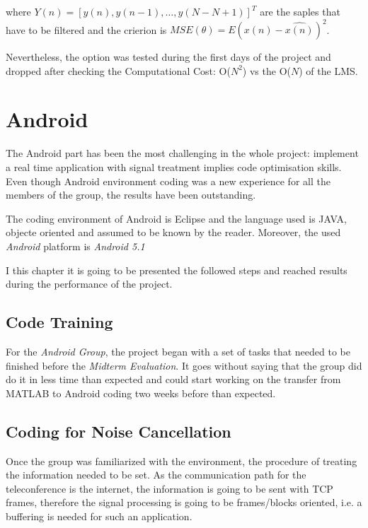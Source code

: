 \documentclass[11pt,a4paper,english]{book}  %
\theoremstyle{definition}  %
\theoremstyle{plain}  %
\theoremstyle{remark}  %
\begin{document}
	where $Y(n)= [y(n),y(n-1),\dots,y(N-N+1)]^T$ are the saples that have to be filtered and the crierion is $MSE(\theta)=E{(x(n)-\hat{x(n)})^2}$.
	
	Nevertheless, the option was tested during the first days of the project and dropped after checking the Computational Cost: O($N^2$) vs the  O($N$) of the LMS.



\chapter{Android}

The Android part has been the most challenging in the whole project: implement a real time application with signal treatment implies code optimisation skills. Even though Android environment coding was a new experience for all the members of the group, the results have been outstanding.

The coding environment of Android is Eclipse and the language used is JAVA, objecte oriented and assumed to be known by the reader. Moreover, the used \textit{Android} platform is \textit{Android 5.1}

I this chapter it is going to be presented the followed steps and reached results during the performance of the project.

\section{Code Training}

For the \textit{Android Group}, the project began with a set of tasks that needed to be finished before the \textit{Midterm Evaluation}. It goes without saying that the group did do it in less time than expected and could start working on the transfer from MATLAB to Android coding two weeks before than expected.

\section{Coding for Noise Cancellation}
\label{sec:coding}

Once the group was familiarized with the environment, the procedure of treating the information needed to be set. As the communication path for the teleconference is the internet, the information is going to be sent with TCP frames, therefore the signal processing is going to be frames/blocks oriented, i.e. a buffering is needed for such an application.
\end{document}
